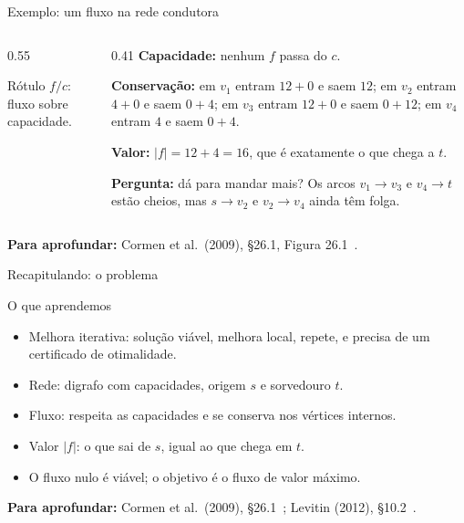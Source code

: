 \documentclass[aspectratio=169,xcolor=table]{beamer}
\newcommand{\nosrede}[1]{%
  \node[vert] (s)  at (0,0)     {$s$};
  \node[vert] (v1) at (1.7,1)   {$v_1$};
  \node[vert] (v2) at (1.7,-1)  {$v_2$};
  \node[vert] (v3) at (3.6,1)   {$v_3$};
  \node[vert] (v4) at (3.6,-1)  {$v_4$};
  \node[vert] (t)  at (5.3,0)   {$t$};
  \def\lista{#1}\ifx\lista\empty\else
    \foreach \v/\n in {#1} \node[vS] at (\v) {$\n$};\fi
}
\newcommand{\rede}[2]{%
  \nosrede{#2}
  \edef\arcosR{#1}
  \foreach \u/\v/\l/\e in \arcosR \draw[\e] (\u) to (\v);
  \foreach \u/\v/\l/\e in \arcosR \path (\u) to node[peso] {\l} (\v);
}
\newcommand{\fonte}[1]{%
  \vfill
  {\tiny\color{gray!55!black}\textbf{Para aprofundar:} #1\par}%
}
\begin{document}
\begin{frame}{Exemplo: um fluxo na rede condutora}
  \begin{columns}[c]
    \begin{column}{0.55\textwidth}
      \begin{center}
      \end{center}
      {\scriptsize Rótulo $f/c$: fluxo sobre capacidade.\par}
    \end{column}
    \begin{column}{0.41\textwidth}
      \scriptsize
      \textbf{Capacidade:} nenhum $f$ passa do $c$.
      \smallskip

      \textbf{Conservação:} em $v_1$ entram $12 + 0$ e saem $12$; em $v_2$ entram $4 + 0$ e
      saem $0 + 4$; em $v_3$ entram $12 + 0$ e saem $0 + 12$; em $v_4$ entram $4$ e saem
      $0 + 4$.
      \smallskip

      \textbf{Valor:} $|f| = 12 + 4 = 16$, que é exatamente o que chega a $t$.
      \medskip

      \textbf{Pergunta:} dá para mandar mais? Os arcos $v_1 \to v_3$ e $v_4 \to t$ estão
      cheios, mas $s \to v_2$ e $v_2 \to v_4$ ainda têm folga.
    \end{column}
  \end{columns}
  \fonte{Cormen et al.\ (2009), \S 26.1, Figura 26.1~\cite{cormen2009introduction}.}
\end{frame}

\begin{frame}{Recapitulando: o problema}
  \begin{block}{O que aprendemos}
    \begin{itemize}
      \item Melhora iterativa: solução viável, melhora local, repete, e precisa de um
        certificado de otimalidade.
      \item Rede: digrafo com capacidades, origem $s$ e sorvedouro $t$.
      \item Fluxo: respeita as capacidades e se conserva nos vértices internos.
      \item Valor $|f|$: o que sai de $s$, igual ao que chega em $t$.
      \item O fluxo nulo é viável; o objetivo é o fluxo de valor máximo.
    \end{itemize}
  \end{block}
  \fonte{Cormen et al.\ (2009), \S 26.1~\cite{cormen2009introduction};
    Levitin (2012), \S 10.2~\cite{levitin2012introduction}.}
\end{frame}
\end{document}
